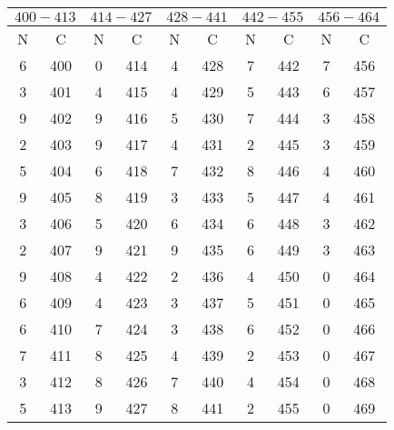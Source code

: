  \begin{table}
    \centering
    \caption{} 
    \label{}
    \begin{tabular}{c c || c c || c c || c c || c c}
        \midrule
        \multicolumn{2}{c}{$400-413$} & \multicolumn{2}{c}{$414-427$} & \multicolumn{2}{c}{$428-441$} & \multicolumn{2}{c}{$442-455$} & \multicolumn{2}{c}{$456-464$} \\
        \midrule
        N & C & N & C & N & C & N & C & N & C \\
        \midrule
6    &   400 & 0    &   414 & 4     &  428 &7      & 442  & 7    &   456    \\
3    &   401 & 4    &   415 & 4     &  429 &5      & 443  & 6    &   457    \\
9    &   402 & 9    &   416 & 5     &  430 &7      & 444  & 3    &   458    \\
2    &   403 & 9    &   417 & 4     &  431 &2      & 445  & 3    &   459    \\
5    &   404 & 6    &   418 & 7     &  432 &8      & 446  & 4    &   460    \\
9    &   405 & 8    &   419 & 3     &  433 &5      & 447  & 4    &   461    \\
3    &   406 & 5    &   420 & 6     &  434 &6      & 448  & 3    &   462    \\
2    &   407 & 9    &   421 & 9     &  435 &6      & 449  & 3    &   463    \\
9    &   408 & 4    &   422 & 2     &  436 &4      & 450  & 0    &   464    \\
6    &   409 & 4    &   423 & 3     &  437 &5      & 451  & 0    &   465    \\
6    &   410 & 7    &   424 & 3     &  438 &6      & 452  & 0    &   466    \\
7    &   411 & 8    &   425 & 4     &  439 &2      & 453  & 0    &   467    \\
3    &   412 & 8    &   426 & 7     &  440 &4      & 454  & 0    &   468    \\
5    &   413 & 9    &   427 & 8     &  441 &2      & 455  & 0    &   469    \\
    \end{tabular}
\end{table}